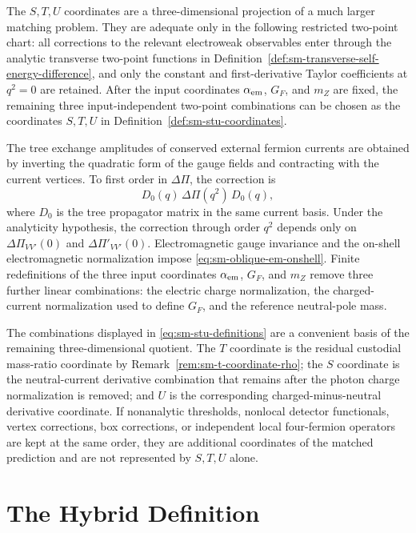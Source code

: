 \begin{controlledapproximation}
\label{ca:sm-stu-domain}
The \(S,T,U\) coordinates are a three-dimensional projection of a much larger
matching problem.  They are adequate only in the following restricted
two-point chart: all corrections to the relevant electroweak observables
enter through the analytic transverse two-point functions in
Definition~\ref{def:sm-transverse-self-energy-difference}, and only the
constant and first-derivative Taylor coefficients at \(q^2=0\) are retained.
After the input coordinates \(\alpha_{\rm em}\), \(G_F\), and \(m_Z\) are
fixed, the remaining three input-independent two-point combinations can be
chosen as the coordinates \(S,T,U\) in
Definition~\ref{def:sm-stu-coordinates}.

The tree exchange amplitudes of conserved external fermion currents are
obtained by inverting the quadratic form of the gauge fields and contracting
with the current vertices.  To first order in
\(\Delta\Pi\), the correction is
\[
  D_0(q)\,\Delta\Pi(q^2)\,D_0(q),
\]
where \(D_0\) is the tree propagator matrix in the same current basis.  Under
the analyticity hypothesis, the correction through order \(q^2\) depends only
on \(\Delta\Pi_{VV'}(0)\) and \(\Delta\Pi'_{VV'}(0)\).  Electromagnetic gauge
invariance and the on-shell electromagnetic normalization impose
\eqref{eq:sm-oblique-em-onshell}.  Finite redefinitions of the three input
coordinates \(\alpha_{\rm em}\), \(G_F\), and \(m_Z\) remove three further
linear combinations: the electric charge normalization, the charged-current
normalization used to define \(G_F\), and the reference neutral-pole mass.

The combinations displayed in \eqref{eq:sm-stu-definitions} are a convenient
basis of the remaining three-dimensional quotient.  The \(T\) coordinate is
the residual custodial mass-ratio coordinate by
Remark~\ref{rem:sm-t-coordinate-rho}; the \(S\) coordinate is the
neutral-current derivative combination that remains after the photon charge
normalization is removed; and \(U\) is the corresponding charged-minus-neutral
derivative coordinate.  If nonanalytic thresholds, nonlocal detector
functionals, vertex corrections, box corrections, or independent local
four-fermion operators are kept at the same order, they are additional
coordinates of the matched prediction and are not represented by \(S,T,U\)
alone.
\end{controlledapproximation}

\section{The Hybrid Definition}

